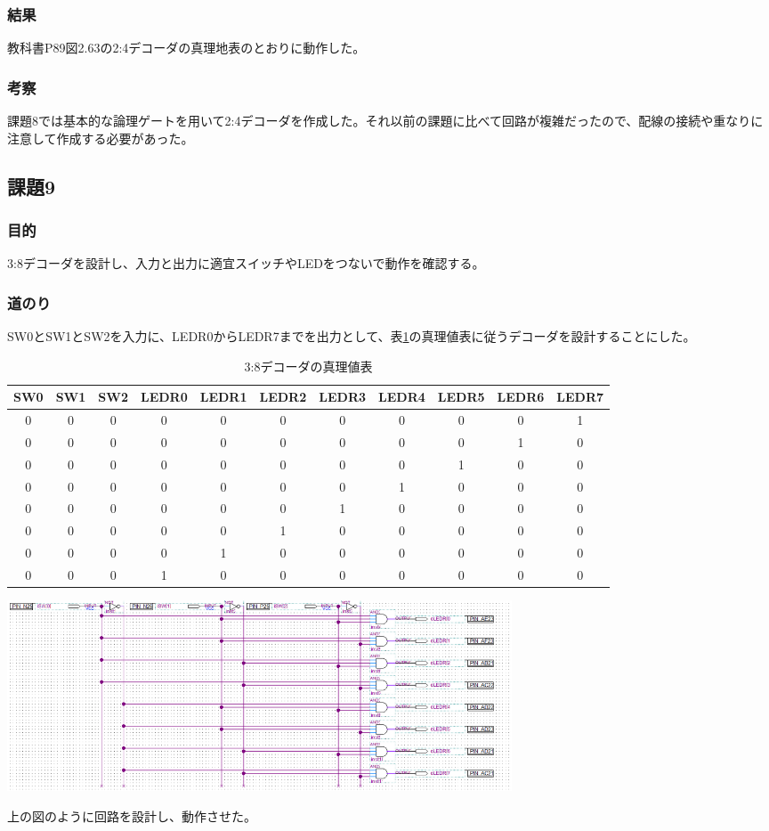 \documentclass[a4paper]{jarticle}
\begin{document}
\subsubsection{結果}
教科書P89図2.63の2:4デコーダの真理地表のとおりに動作した。
\subsubsection{考察}
課題8では基本的な論理ゲートを用いて2:4デコーダを作成した。それ以前の課題に比べて回路が複雑だったので、配線の接続や重なりに注意して作成する必要があった。
\subsection{課題9}
\subsubsection{目的}
3:8デコーダを設計し、入力と出力に適宜スイッチやLEDをつないで動作を確認する。
\subsubsection{道のり}
SW0とSW1とSW2を入力に、LEDR0からLEDR7までを出力として、表\ref{Report9decoder}の真理値表に従うデコーダを設計することにした。
\begin{table}[ht]
	\begin{center}
		\caption{3:8デコーダの真理値表}
		\label{Report9decoder}
		\begin{tabular}{|c|c|c|c|c|c|c|c|c|c|c|}								\hline
			SW0	&SW1	&SW2	&LEDR0	&LEDR1	&LEDR2	&LEDR3	&LEDR4	&LEDR5	&LEDR6	&LEDR7\\	\hline\hline
			0	&0	&0	&0	&0	&0	&0	&0	&0	&0	&1\\		\hline
			0	&0	&0	&0	&0	&0	&0	&0	&0	&1	&0\\		\hline
			0	&0	&0	&0	&0	&0	&0	&0	&1	&0	&0\\		\hline
			0	&0	&0	&0	&0	&0	&0	&1	&0	&0	&0\\		\hline
			0	&0	&0	&0	&0	&0	&1	&0	&0	&0	&0\\		\hline
			0	&0	&0	&0	&0	&1	&0	&0	&0	&0	&0\\		\hline
			0	&0	&0	&0	&1	&0	&0	&0	&0	&0	&0\\		\hline
			0	&0	&0	&1	&0	&0	&0	&0	&0	&0	&0\\		\hline
		\end{tabular}
	\end{center}
\end{table}
\begin{center}
	\includegraphics[width=15cm]{work9.PNG}
\end{center}
上の図のように回路を設計し、動作させた。
\end{document}
